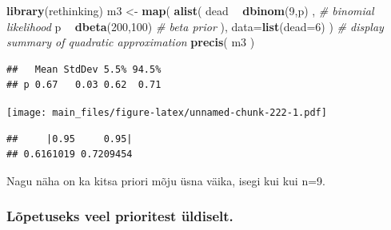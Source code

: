\documentclass[]{book}
\newenvironment{Shaded}{\begin{snugshade}}{\end{snugshade}}
\newcommand{\KeywordTok}[1]{\textcolor[rgb]{0.13,0.29,0.53}{\textbf{#1}}}
\newcommand{\DataTypeTok}[1]{\textcolor[rgb]{0.13,0.29,0.53}{#1}}
\newcommand{\DecValTok}[1]{\textcolor[rgb]{0.00,0.00,0.81}{#1}}
\newcommand{\FloatTok}[1]{\textcolor[rgb]{0.00,0.00,0.81}{#1}}
\newcommand{\StringTok}[1]{\textcolor[rgb]{0.31,0.60,0.02}{#1}}
\newcommand{\CommentTok}[1]{\textcolor[rgb]{0.56,0.35,0.01}{\textit{#1}}}
\newcommand{\OperatorTok}[1]{\textcolor[rgb]{0.81,0.36,0.00}{\textbf{#1}}}
\newcommand{\NormalTok}[1]{#1}
\begin{document}
\begin{Shaded}
\begin{Highlighting}[]
\KeywordTok{library}\NormalTok{(rethinking)}
\NormalTok{m3 <-}\StringTok{ }\KeywordTok{map}\NormalTok{(}
    \KeywordTok{alist}\NormalTok{(}
\NormalTok{        dead }\OperatorTok{~}\StringTok{ }\KeywordTok{dbinom}\NormalTok{(}\DecValTok{9}\NormalTok{,p) ,  }\CommentTok{# binomial likelihood}
\NormalTok{        p }\OperatorTok{~}\StringTok{ }\KeywordTok{dbeta}\NormalTok{(}\DecValTok{200}\NormalTok{,}\DecValTok{100}\NormalTok{)     }\CommentTok{# beta prior}
\NormalTok{), }\DataTypeTok{data=}\KeywordTok{list}\NormalTok{(}\DataTypeTok{dead=}\DecValTok{6}\NormalTok{) )}
\CommentTok{# display summary of quadratic approximation}
\KeywordTok{precis}\NormalTok{( m3 )}
\end{Highlighting}
\end{Shaded}

\begin{verbatim}
##   Mean StdDev 5.5% 94.5%
## p 0.67   0.03 0.62  0.71
\end{verbatim}

\begin{Shaded}
\end{Shaded}

\texttt{[image: main\_files/figure-latex/unnamed-chunk-222-1.pdf]}

\begin{Shaded}
\end{Shaded}

\begin{verbatim}
##     |0.95     0.95| 
## 0.6161019 0.7209454
\end{verbatim}

Nagu näha on ka kitsa priori mõju üsna väika, isegi kui kui n=9.

\subsubsection{Lõpetuseks veel prioritest
üldiselt.}\label{lopetuseks-veel-prioritest-uldiselt.}
\end{document}
